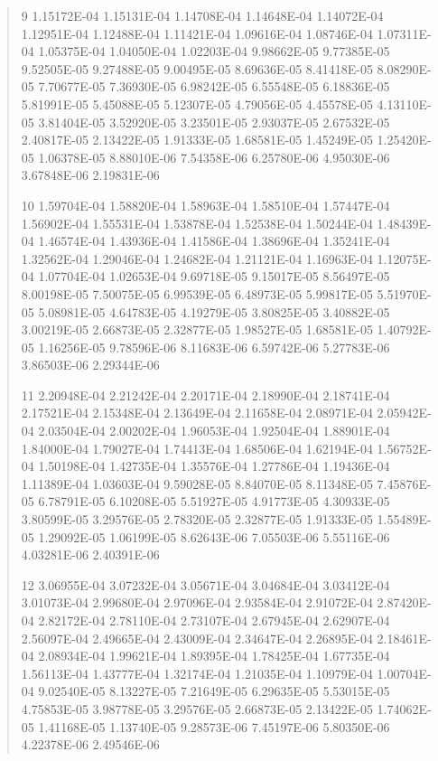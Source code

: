 \documentclass[letterpaper,10pt,english]{sphinxmanual}
\begin{document}
\begin{quote}
\begin{DUlineblock}{0em}
\begin{DUlineblock}{\DUlineblockindent}
\item[] 9   1.15172E-04  1.15131E-04  1.14708E-04  1.14648E-04  1.14072E-04  1.12951E-04  1.12488E-04  1.11421E-04  1.09616E-04  1.08746E-04  1.07311E-04  1.05375E-04  1.04050E-04  1.02203E-04  9.98662E-05  9.77385E-05  9.52505E-05  9.27488E-05  9.00495E-05  8.69636E-05  8.41418E-05  8.08290E-05  7.70677E-05  7.36930E-05  6.98242E-05  6.55548E-05  6.18836E-05  5.81991E-05  5.45088E-05  5.12307E-05  4.79056E-05  4.45578E-05  4.13110E-05  3.81404E-05  3.52920E-05  3.23501E-05  2.93037E-05  2.67532E-05  2.40817E-05  2.13422E-05  1.91333E-05  1.68581E-05  1.45249E-05  1.25420E-05  1.06378E-05  8.88010E-06  7.54358E-06  6.25780E-06  4.95030E-06  3.67848E-06  2.19831E-06
\end{DUlineblock}
\item[] 10   1.59704E-04  1.58820E-04  1.58963E-04  1.58510E-04  1.57447E-04  1.56902E-04  1.55531E-04  1.53878E-04  1.52538E-04  1.50244E-04  1.48439E-04  1.46574E-04  1.43936E-04  1.41586E-04  1.38696E-04  1.35241E-04  1.32562E-04  1.29046E-04  1.24682E-04  1.21121E-04  1.16963E-04  1.12075E-04  1.07704E-04  1.02653E-04  9.69718E-05  9.15017E-05  8.56497E-05  8.00198E-05  7.50075E-05  6.99539E-05  6.48973E-05  5.99817E-05  5.51970E-05  5.08981E-05  4.64783E-05  4.19279E-05  3.80825E-05  3.40882E-05  3.00219E-05  2.66873E-05  2.32877E-05  1.98527E-05  1.68581E-05  1.40792E-05  1.16256E-05  9.78596E-06  8.11683E-06  6.59742E-06  5.27783E-06  3.86503E-06  2.29344E-06
\item[] 11   2.20948E-04  2.21242E-04  2.20171E-04  2.18990E-04  2.18741E-04  2.17521E-04  2.15348E-04  2.13649E-04  2.11658E-04  2.08971E-04  2.05942E-04  2.03504E-04  2.00202E-04  1.96053E-04  1.92504E-04  1.88901E-04  1.84000E-04  1.79027E-04  1.74413E-04  1.68506E-04  1.62194E-04  1.56752E-04  1.50198E-04  1.42735E-04  1.35576E-04  1.27786E-04  1.19436E-04  1.11389E-04  1.03603E-04  9.59028E-05  8.84070E-05  8.11348E-05  7.45876E-05  6.78791E-05  6.10208E-05  5.51927E-05  4.91773E-05  4.30933E-05  3.80599E-05  3.29576E-05  2.78320E-05  2.32877E-05  1.91333E-05  1.55489E-05  1.29092E-05  1.06199E-05  8.62643E-06  7.05503E-06  5.55116E-06  4.03281E-06  2.40391E-06
\item[] 12   3.06955E-04  3.07232E-04  3.05671E-04  3.04684E-04  3.03412E-04  3.01073E-04  2.99680E-04  2.97096E-04  2.93584E-04  2.91072E-04  2.87420E-04  2.82172E-04  2.78110E-04  2.73107E-04  2.67945E-04  2.62907E-04  2.56097E-04  2.49665E-04  2.43009E-04  2.34647E-04  2.26895E-04  2.18461E-04  2.08934E-04  1.99621E-04  1.89395E-04  1.78425E-04  1.67735E-04  1.56113E-04  1.43777E-04  1.32174E-04  1.21035E-04  1.10979E-04  1.00704E-04  9.02540E-05  8.13227E-05  7.21649E-05  6.29635E-05  5.53015E-05  4.75853E-05  3.98778E-05  3.29576E-05  2.66873E-05  2.13422E-05  1.74062E-05  1.41168E-05  1.13740E-05  9.28573E-06  7.45197E-06  5.80350E-06  4.22378E-06  2.49546E-06

\end{DUlineblock}
\end{quote}
\end{document}
